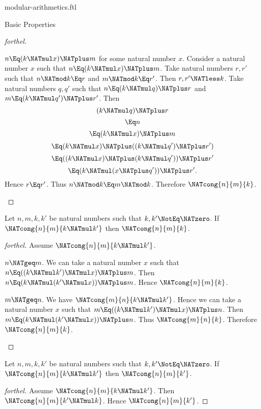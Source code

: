 \documentclass{stex}
\begin{document}
\begin{smodule}{modular-arithmetics.ftl}
\begin{sfragment}{Basic Properties}
\begin{proof}[forthel]
    \begin{case}{$n \Eq (k \NATmul x) \NATplus m$ for some natural number $x$.}
      Consider a natural number $x$ such that $n \Eq (k \NATmul x) \NATplus m$.
      Take natural numbers $r, r'$ such that $n \NATmod k \Eq r$ and $m \NATmod k \Eq r'$.
      Then $r, r' \NATless k$.
      Take natural numbers $q, q'$ such that $n \Eq (k \NATmul q) \NATplus r$ and $m \Eq (k \NATmul q') \NATplus r'$.
      Then
      \[  (k \NATmul q) \NATplus r                         \]
      \[    \Eq n                                   \]
      \[    \Eq (k \NATmul x) \NATplus m                     \]
      \[    \Eq (k \NATmul x) \NATplus ((k \NATmul q') \NATplus r')   \]
      \[    \Eq ((k \NATmul x) \NATplus (k \NATmul q')) \NATplus r'   \]
      \[    \Eq (k \NATmul (x \NATplus q')) \NATplus r'.            \]
      Hence $r \Eq r'$.
      Thus $n \NATmod k \Eq m \NATmod k$.
      Therefore $\NATcong{n}{m}{k}$.
    \end{case}
  \end{proof}

  \begin{proposition}[forthel,id=ARITHMETIC_08_2988318228742144]
    Let $n, m, k, k'$ be natural numbers such that $k, k' \NotEq \NATzero$.
    If $\NATcong{n}{m}{k \NATmul k'}$ then $\NATcong{n}{m}{k}$.
  \end{proposition}
  \begin{proof}[forthel]
    Assume $\NATcong{n}{m}{k \NATmul k'}$.

    \begin{case}{$n \NATgeq m$.}
      We can take a natural number $x$ such that $n \Eq ((k \NATmul k') \NATmul x) \NATplus m$.
      Then $n \Eq (k \NATmul (k' \NATmul x)) \NATplus m$.
      Hence $\NATcong{n}{m}{k}$.
    \end{case}

    \begin{case}{$m \NATgeq n$.}
      We have $\NATcong{m}{n}{k \NATmul k'}$.
      Hence we can take a natural number $x$ such that $m \Eq ((k \NATmul k') \NATmul x) \NATplus n$.
      Then $m \Eq (k \NATmul (k' \NATmul x)) \NATplus n$.
      Thus $\NATcong{m}{n}{k}$.
      Therefore $\NATcong{n}{m}{k}$.
    \end{case}
  \end{proof}

  \begin{corollary}[forthel,id=ARITHMETIC_08_5895145169879040]
    Let $n, m, k, k'$ be natural numbers such that $k, k' \NotEq \NATzero$.
    If $\NATcong{n}{m}{k \NATmul k'}$ then $\NATcong{n}{m}{k'}$.
  \end{corollary}
  \begin{proof}[forthel]
    Assume $\NATcong{n}{m}{k \NATmul k'}$.
    Then $\NATcong{n}{m}{k' \NATmul k}$.
    Hence $\NATcong{n}{m}{k'}$.
  \end{proof}


\end{sfragment}
\end{smodule}
\end{document}
